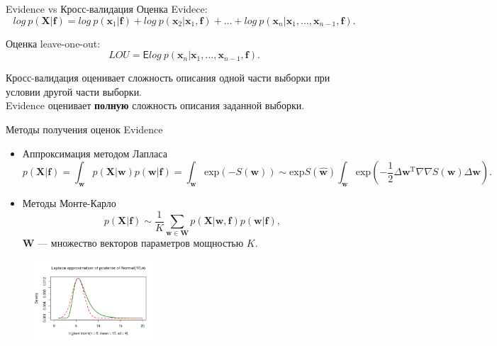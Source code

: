\documentclass[10pt,pdf,utf8,russian,aspectratio=169]{beamer}
\begin{document}
\begin{frame}{Evidence vs Кросс-валидация}
Оценка Evidece:
\[
log~p(\mathbf{X}|\mathbf{f}) = log~p(\mathbf{x}_1|\mathbf{f}) + log~p(\mathbf{x}_2|\mathbf{x}_1, \mathbf{f}) + \dots +  log~p(\mathbf{x}_n|\mathbf{x}_1,\dots,\mathbf{x}_{n-1}, \mathbf{f}).
\]

Оценка leave-one-out:
\[
LOU = \mathsf{E} log~p(\mathbf{x}_n|\mathbf{x}_1,\dots,\mathbf{x}_{n-1}, \mathbf{f}).
\]

Кросс-валидация оценивает сложность описания одной части выборки при условии другой части выборки. \\
Evidence оценивает \textbf{полную} сложность описания заданной выборки.
\end{frame}

\begin{frame}{Методы получения оценок Evidence}
\begin{itemize}
\item{Аппроксимация методом Лапласа}\\
$$
	p(\mathbf{X}|\mathbf{f}) = \int_\mathbf{w} p(\mathbf{X}|\mathbf{w}) p(\mathbf{w}|\mathbf{f}) = \int_\mathbf{w} \text{exp}(-S(\mathbf{w}))	\sim  \text{exp}S(\hat{\mathbf{w}}) \int_\mathbf{w} \text{exp} (-\frac{1}{2}\Delta \mathbf{w}^\text{T} \nabla \nabla S(\mathbf{w}) \Delta \mathbf{w} ).
$$

\item {Методы Монте-Карло}
$$
p(\mathbf{X}|\mathbf{f})  \sim \frac{1}{K}\sum_{\mathbf{w} \in \mathbf{W}} p(\mathbf{X}|\mathbf{w},\mathbf{f})p(\mathbf{w}|\mathbf{f}),
$$
$\mathbf{W}$ --- множество векторов параметров мощностью $K$.
\end{itemize}
\begin{figure}
  \centering
 \includegraphics[width=0.4\textwidth]{laplace2.png}
\label{fig:1}\qquad	
\end{figure}
\end{frame}
\end{document}

